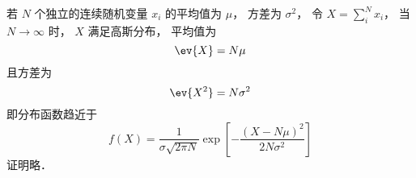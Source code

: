 
\begin{issues}
\issueDraft
\end{issues}


若 $N$ 个独立的连续随机变量 $x_i$ 的平均值为 $\mu$， 方差为 $\sigma^2$， 令 $X = \sum_i^N x_i$， 当 $N \to \infty$ 时， $X$ 满足高斯分布， 平均值为
\begin{equation}
\ev{X} = N\mu
\end{equation}
且方差为
\begin{equation}
\ev{X^2} = N\sigma^2
\end{equation}
即分布函数趋近于
\begin{equation}
f(X) = \frac{1}{\sigma\sqrt{2\pi N}} \exp[-\frac{(X-N\mu)^2}{2N\sigma^2}]
\end{equation}
证明略．
